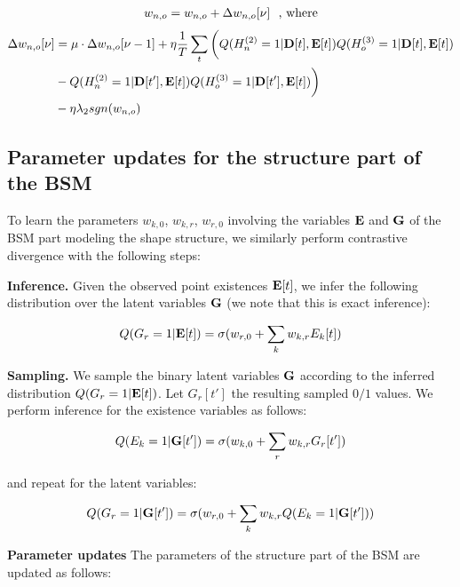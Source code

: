 \begin{align*}
w_{n, o} = w_{n, o} + \Delta w_{n, o}[\nu]  \textrm{\,\,\,\,, where}
\end{align*}
\begin{align*}
\Delta w_{n, o}[\nu] &= \mu \cdot \Delta w_{n, o}[\nu-1] + \eta \frac{1}{T}\sum\limits_t  \bigg( Q( H_n^{(2)} = 1 | \mathbf{D}[t], \mathbf{E}[t] ) Q( H_o^{(3)} = 1 | \mathbf{D}[t], \mathbf{E}[t] ) \\
										   & - Q( H_n^{(2)} = 1 | \mathbf{D}[t'], \mathbf{E}[t]) Q( H_o^{(3)} = 1 | \mathbf{D}[t'], \mathbf{E}[t]) \bigg) \\
										   & - \eta \lambda_2 sgn( w_{n, o} )  \\
\end{align*}



\subsection{Parameter updates for the structure part of the BSM}
To learn the parameters $w_{k,0}$, $w_{k,r}$, $w_{r,0}$ involving the variables $\mathbf{E}$ and $\mathbf{G}$ of the BSM part modeling the shape structure, we similarly perform contrastive divergence with the following steps:

\textbf{Inference.}  Given the observed point existences $\mathbf{E}[t]$, we infer the following distribution over the latent variables $\mathbf{G}$ (we note that this is exact inference): 

\begin{align*}
Q( G_r = 1 | \mathbf{E}[t] ) = \sigma(  w_{r, 0} + \sum\limits_{k} w_{k, r} E_k[t]  )
\end{align*}

\textbf{Sampling.} We sample the binary latent variables $\mathbf{G}$ according to the inferred distribution $Q( G_r=1 | \mathbf{E}[t] )$. Let $G_r[t']$ the resulting sampled $0/1$ values. We perform inference for the existence variables as follows:

\begin{align*}
Q( E_k = 1 | \mathbf{G}[t'] ) = \sigma(  w_{k, 0} + \sum\limits_{r} w_{k, r} G_r[t']  )
\end{align*}

and repeat for the latent variables:

\begin{align*}
Q( G_r = 1 | \mathbf{G}[t'] ) = \sigma(  w_{r, 0} + \sum\limits_{k} w_{k, r} Q( E_k = 1 | \mathbf{G}[t'] ) )
\end{align*}

 
\textbf{Parameter updates} The parameters of the structure part of the BSM are updated as follows:


